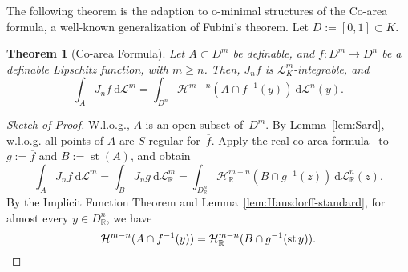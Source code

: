 \documentclass[a4paper, 12pt, final]{article}
\newtheorem{thm}[lem]{Theorem}
\newtheorem{open problem}[lem]{Open problem}
\theoremstyle{remark}
\theoremstyle{definition}
\newtheorem{final remark}[lem]{Final remark}
\begin{document}
The following theorem is the adaption to o-minimal structures of the Co-area
formula, a well-known generalization of Fubini's theorem.
Let ${D} := [0,1] \subset {K}$.

\begin{thm}[Co-area Formula]
Let $A \subset D^m$ be definable,
and $f: {D}^m \to {D}^n$ be a definable Lipschitz function, with $m \geq n$.
Then, ${J}_n f$ is ${\mathcal L}^m_{K}$-integrable, and
\[
\int_A {J}_n f {\:\mathrm d} {\mathcal L}^m =
\int_{{D}^n} {\mathcal H}^{m - n}(A \cap f^{-1}(y)) {\:\mathrm d} {{\mathcal L}^n}(y).
\]
\end{thm}
\begin{proof}[Sketch of Proof]
{W.l.o.g\mbox{.}\xspace}, $A$ is an open subset of~${D}^m$.
By Lemma~\ref{lem:Sard}, {w.l.o.g\mbox{.}\xspace} all points of $A$ are $S$-regular for~${\overline{f}}$.
Apply the real co-area formula~\cite{morgan} to $g := {\overline{f}}$ and $B :=
\operatorname{st}(A)$, and obtain
\[
\int_A {J}_n f {\:\mathrm d} {\mathcal L}^m = \int_B {J}_n g {\:\mathrm d} {\mathcal L}^m_{\mathbb{R}} =
\int_{{D}_{\mathbb{R}}^n} {\mathcal H}^{m - n}_{\mathbb{R}} (B \cap g^{-1}(z)) {\:\mathrm d} {\mathcal L}^n_{\mathbb{R}}(z).
\]
By the Implicit Function Theorem and Lemma~\ref{lem:Hausdorff-standard},
for almost every $y \in {D}_{\mathbb{R}}^n$, we have
\[
{\mathcal H}^{m - n}(A \cap f^{-1}(y)) = {\mathcal H}^{m - n}_{\mathbb{R}}(B \cap g^{-1}(\operatorname{st} y)).
\qedhere
\]
\end{proof}
\end{document}
